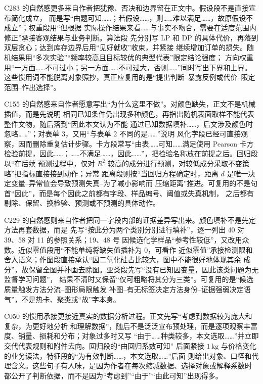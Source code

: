 C283 的自然感更多来自作者把犹豫、否决和边界留在正文中。假设段不是直接宣布简化成立，
而是写“由题可知……；若假设……，则……难以满足……，故原假设不成立”；权重段用“但根据
实际操作结果来看……与事实不吻合，需要在适度范围内修正”承接客观结果与业务判断。算法段
先分别写 LP 和 DP 的具体代价，再落到双层贪心；达到库存边界后用“见好就收”收束，并紧接
继续增加订单的损失。随机结果用“多次实验”“频率较高且目标较优的典型代表”限定结论强度；
方向权重用“一方面……不可过小；另一方面……不可过大，否则……”同时写出下界和上界。
这些惯用词不能脱离对象照抄，真正应复用的是“提出判断--暴露反例或代价--限定范围--作出选择”。

C155 的自然感来自作者愿意写出“为什么这里不做”。对颜色缺失，正文不是机械插值，而是先说明
相同已知条件仍出现多种颜色，再指出随机表面取样不能代表整件文物，随后落到“因此本文认为不能
通过已知数据填补……，后文涉及颜色时忽略……”；对表单 3，又用“与表单 2 不同的是……”说明
风化字段已经可直接观察，因而删除重复估计步骤。卡方段常写“由表……可知……满足使用 Pearson
卡方检验前提，因此……；……不满足……，因此……”，把检验名称放在前提之后。回归段以“在后续
预测过程中，仅对 $R^2$ 较高的成分进行预测，对较低成分采取不变策略”把指标直接接到动作；异常
距离段则按“当回归方程确定时，距离 $d$ 是唯一决定变量--异常值会导致预测失真--为了减小影响而
压缩距离”推进。可复用的不是句首“因此”，而是每个因此之前都有字段、样品编号、阈值或失真机制，
之后都有剔除、保留、换检验、预测或不预测的具体动作。

C229 的自然感则来自作者把同一字段内部的证据差异写出来。颜色填补不是先定方法再套数据，而是
先写“按此分为两个类别分别进行填补”，逐一列出 40 对 39、58 对 11 的参照关系；19、48 号
因候选化学样品“参考性较低”，又改用众数。近似零值段用“不能单纯将缺失值插补为 0，可看作
近似零值”承接检测限和舍入语义；作图段直接承认“因二氧化硅占比较大，图中不能很好地体现其余
成分”，故保留全图并补画去除图。亚类段先写“没有已知因变量，因此该类问题为无监督学习问题”，
结果不清时又保留“仅可粗略将其分为三类”。可复用的是“候选质量触发方法分流--图形局限触发
补图--有无标签决定方法身份--证据强弱决定语气”，不是热卡、聚类或“故”字本身。

C050 的惯用承接更接近真实的数据分析过程。正文先写“考虑到数据较为庞大和复杂，为更好地分析
和理解数据”，随后不是泛泛宣布预处理，而是逐项观察丰富度、销量、损耗和分布；对象过多时又写
“由于……种类较多，本文选取……”并立即交代代表规则和附件去向。回归段的“由回归系数可知”
后面紧接 $1\,\mathrm{kg}$ 与价格变化的业务读法，特征段的“为有效判断……，本文选取……”后面
则给出对象、口径和代理含义。这些句子有人味，是因为作者在每次缩减数据、选择对象或解释系数时
都公开了判断依据，而不是因为“考虑到”“由于”“由此可知”出现得多。

